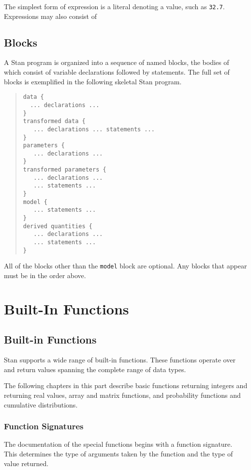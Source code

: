 \documentclass[10pt]{report}
\newcommand{\Stan}{Stan\xspace}
\newcommand{\code}[1]{{\tt #1}}
\begin{document}
The simplest form of expression is a literal denoting a
value, such as \code{32.7}.  Expressions may also consist of


\chapter{Blocks}

A \Stan program is organized into a sequence of named blocks, the
bodies of which consist of variable declarations followed by
statements.  The full set of blocks is exemplified in the following
skeletal \Stan program.
%
\begin{quote}
\begin{Verbatim} 
data { 
  ... declarations ...
}
transformed data { 
   ... declarations ... statements ... 
}
parameters { 
   ... declarations ... 
}
transformed parameters { 
   ... declarations ...
   ... statements ...
}
model { 
   ... statements ...
}
derived quantities {
   ... declarations ...
   ... statements ...
}
\end{Verbatim}
\end{quote}
%
All of the blocks other than the \code{model} block are optional.  Any
blocks that appear must be in the order above.


\part{Built-In Functions} 

\chapter{Built-in Functions}

\Stan supports a wide range of built-in functions.  These functions
operate over and return values spanning the complete range of data
types.  

The following chapters in this part describe basic functions returning
integers and returning real values, array and matrix functions, and
probability functions and cumulative distributions.

\section{Function Signatures}

The documentation of the special functions begins with a function
signature.  This determines the type of arguments taken by the
function and the type of value returned.  
\end{document}

